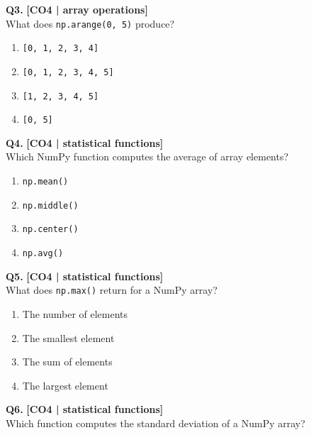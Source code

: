 \noindent\textbf{Q3.} \hfill {\small\color{LPUOrange}\textbf{[CO4 | array operations]}}\\[2pt]
What does \texttt{np.arange(0, 5)} produce?

\begin{enumerate}[label=(\alph*),topsep=2pt,itemsep=1pt,partopsep=0pt,parsep=0pt]
    \item \relax \texttt{[0, 1, 2, 3, 4]}
    \item \relax \texttt{[0, 1, 2, 3, 4, 5]}
    \item \relax \texttt{[1, 2, 3, 4, 5]}
    \item \relax \texttt{[0, 5]}
\end{enumerate}
\vspace{{2mm}}

\noindent\textbf{Q4.} \hfill {\small\color{LPUOrange}\textbf{[CO4 | statistical functions]}}\\[2pt]
Which NumPy function computes the average of array elements?

\begin{enumerate}[label=(\alph*),topsep=2pt,itemsep=1pt,partopsep=0pt,parsep=0pt]
    \item \relax \texttt{np.mean()}
    \item \relax \texttt{np.middle()}
    \item \relax \texttt{np.center()}
    \item \relax \texttt{np.avg()}
\end{enumerate}
\vspace{{2mm}}

\noindent\textbf{Q5.} \hfill {\small\color{LPUOrange}\textbf{[CO4 | statistical functions]}}\\[2pt]
What does \texttt{np.max()} return for a NumPy array?

\begin{enumerate}[label=(\alph*),topsep=2pt,itemsep=1pt,partopsep=0pt,parsep=0pt]
    \item \relax The number of elements
    \item \relax The smallest element
    \item \relax The sum of elements
    \item \relax The largest element
\end{enumerate}
\vspace{{2mm}}

\noindent\textbf{Q6.} \hfill {\small\color{LPUOrange}\textbf{[CO4 | statistical functions]}}\\[2pt]
Which function computes the standard deviation of a NumPy array?

